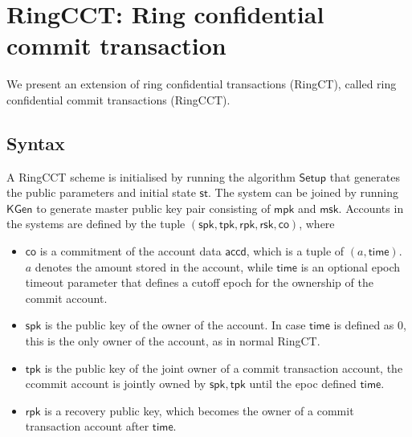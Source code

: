 
\section{RingCCT: Ring confidential commit transaction}
We present an extension of ring confidential transactions (RingCT), called ring confidential commit transactions (RingCCT).

\subsection{Syntax}

A RingCCT scheme is initialised by running the algorithm $\mathsf{Setup}$ that generates the public parameters and initial state $\mathsf{st}$. The system can be joined by running $\mathsf{KGen}$ to generate master public key pair consisting of $\mathsf{mpk}$ and $\mathsf{msk}$.
Accounts in the systems are defined by the tuple $(\mathsf{spk}, \mathsf{tpk}, \mathsf{rpk}, \mathsf{rsk}, \mathsf{co})$, where 
\begin{itemize}
	\item $\mathsf{co}$ is a commitment of the account data $\mathsf{accd}$, which is a tuple of $(a, \mathsf{time})$. $a$ denotes the amount stored in the account, while $\mathsf{time}$ is an optional epoch timeout parameter that defines a cutoff epoch for the ownership of the commit account.
	\item $\mathsf{spk}$ is the public key of the owner of the account. In case $\mathsf{time}$ is defined as 0, this is the only owner of the account, as in normal RingCT.
	\item $\mathsf{tpk}$ is the public key of the joint owner of a commit transaction account, the ccommit account is jointly owned by $\mathsf{spk}, \mathsf{tpk}$ until the epoc defined $\mathsf{time}$.
	\item $\mathsf{rpk}$ is a recovery public key, which becomes the owner of a commit transaction account after $\mathsf{time}$.
\end{itemize}

